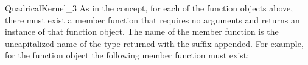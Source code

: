 \begin{ccRefConcept}{QuadricalKernel_3}
As in the  concept, for each of the function objects
above, there must exist a member function that requires no arguments
and returns an instance of that function object. The name of the
member function is the uncapitalized name of the type returned with
the suffix  appended. For example, for the function object 
the following member function must exist: 


\ccSeeAlso


\end{ccRefConcept}
